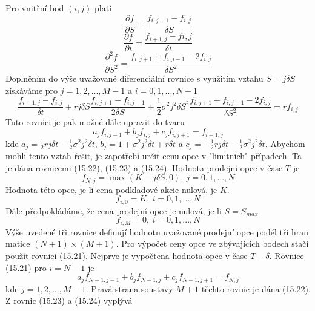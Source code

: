 \documentclass[a4paper]{book}
\begin{document}
Pro vnitřní bod $(i,j)$ platí
\begin{equation*}
\frac{\partial f}{\partial S} = \frac{f_{i,j+1}-f_{i,j}}{\delta S}
\end{equation*}
\begin{equation*}
\frac{\partial f}{\partial t}=\frac{f_{i+1,j}-f{i,j}}{\delta t}
\end{equation*}
\begin{equation*}
\frac{\partial^2 f}{\partial S^2}=\frac{f_{i,j+1}+f_{i,j-1}-2f_{i,j}}{\delta S^2}
\end{equation*}
Doplněním do výše uvažované diferenciální rovnice s využitím vztahu $S=j \delta S$ získáváme pro $j = 1,2,...,M-1$ a $i = 0, 1, ..., N-1$
\begin{equation*}
\frac{f_{i+1,j}-f_{i,j}}{\delta t}+rj\delta S \frac{f_{i,j+1}-f_{i,j-1}}{2 \delta S}+\frac{1}{2}\sigma^2 j^2 \delta S^2 \frac{f_{i,j+1}+f_{i,j-1}-2f_{i,j}}{\delta S^2}=rf_{i,j}
\end{equation*}
Tuto rovnici je pak možné dále upravit do tvaru
\begin{equation}
a_j f_{i,j-1} + b_jf_{i,j} + c_jf_{i,j+1} = f_{i+1,j}
\end{equation}
kde $a_j = \frac{1}{2}rj\delta t-\frac{1}{2} \sigma^2j^2 \delta t$, $b_j = 1 + \sigma^2j^2\delta t + r \delta t$ a $c_j = -\frac{1}{2}rj\delta t - \frac{1}{2}\sigma^2j^2\delta t$.
Abychom mohli tento vztah řešit, je zapotřebí určit cenu opce v "limitních" případech. Ta je dána rovnicemi (15.22), (15.23) a (15.24). Hodnota prodejní opce v čase $T$ je
\begin{equation}
f_{N,j}=\max(K-j \delta S, 0),~j=0,1,..., N
\end{equation}
Hodnota této opce, je-li cena podkladové akcie nulová, je $K$.
\begin{equation}
f_{i,0}=K,~i=0,1,...,N
\end{equation}
Dále předpokládáme, že cena prodejní opce je nulová, je-li $S=S_{max}$
\begin{equation}
f_{i,M}=0,~i=0,1,...,N
\end{equation}
Výše uvedené tři rovnice definují hodnotu uvažované prodejní opce podél tří hran matice $(N+1) \times (M+1)$. Pro výpočet ceny opce ve zbývajících bodech stačí použít rovnici (15.21). Nejprve je vypočtena hodnota opce v čase $T - \delta$. Rovnice (15.21) pro $i = N - 1$ je
\begin{equation}
a_j f_{N-1,j-1}+b_jf_{N-1,j}+c_jf_{N-1,j+1}=f_{N,j}
\end{equation}
kde $j=1,2,...,M-1$. Pravá strana soustavy $M+1$ těchto rovnic je dána (15.22). Z rovnic (15.23) a (15.24) vyplývá
\end{document}
